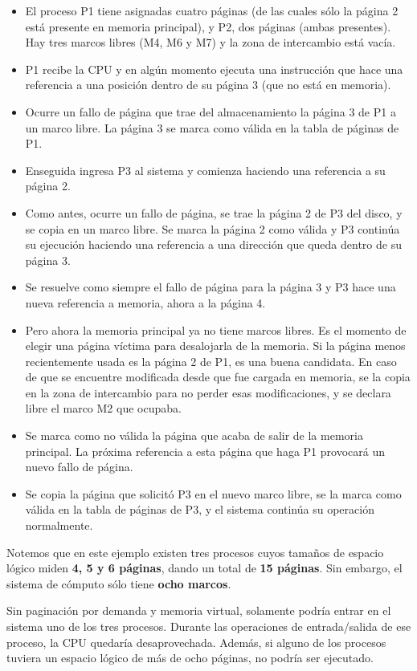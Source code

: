 \documentclass[spanish,a4paper,]{article}
\begin{document}
\begin{itemize}
\item
  El proceso P1 tiene asignadas cuatro páginas (de las cuales sólo la
  página 2 está presente en memoria principal), y P2, dos páginas (ambas
  presentes). Hay tres marcos libres (M4, M6 y M7) y la zona de
  intercambio está vacía.
\item
  P1 recibe la CPU y en algún momento ejecuta una instrucción que hace
  una referencia a una posición dentro de su página 3 (que no está en
  memoria).
\item
  Ocurre un fallo de página que trae del almacenamiento la página 3 de
  P1 a un marco libre. La página 3 se marca como válida en la tabla de
  páginas de P1.
\item
  Enseguida ingresa P3 al sistema y comienza haciendo una referencia a
  su página 2.
\item
  Como antes, ocurre un fallo de página, se trae la página 2 de P3 del
  disco, y se copia en un marco libre. Se marca la página 2 como válida
  y P3 continúa su ejecución haciendo una referencia a una dirección que
  queda dentro de su página 3.
\item
  Se resuelve como siempre el fallo de página para la página 3 y P3 hace
  una nueva referencia a memoria, ahora a la página 4.
\item
  Pero ahora la memoria principal ya no tiene marcos libres. Es el
  momento de elegir una página víctima para desalojarla de la memoria.
  Si la página menos recientemente usada es la página 2 de P1, es una
  buena candidata. En caso de que se encuentre modificada desde que fue
  cargada en memoria, se la copia en la zona de intercambio para no
  perder esas modificaciones, y se declara libre el marco M2 que
  ocupaba.
\item
  Se marca como no válida la página que acaba de salir de la memoria
  principal. La próxima referencia a esta página que haga P1 provocará
  un nuevo fallo de página.
\item
  Se copia la página que solicitó P3 en el nuevo marco libre, se la
  marca como válida en la tabla de páginas de P3, y el sistema continúa
  su operación normalmente.
\end{itemize}

Notemos que en este ejemplo existen tres procesos cuyos tamaños de
espacio lógico miden \textbf{4, 5 y 6 páginas}, dando un total de
\textbf{15 páginas}. Sin embargo, el sistema de cómputo sólo tiene
\textbf{ocho marcos}.

Sin paginación por demanda y memoria virtual, solamente podría entrar en
el sistema uno de los tres procesos. Durante las operaciones de
entrada/salida de ese proceso, la CPU quedaría desaprovechada. Además,
si alguno de los procesos tuviera un espacio lógico de más de ocho
páginas, no podría ser ejecutado.
\end{document}
